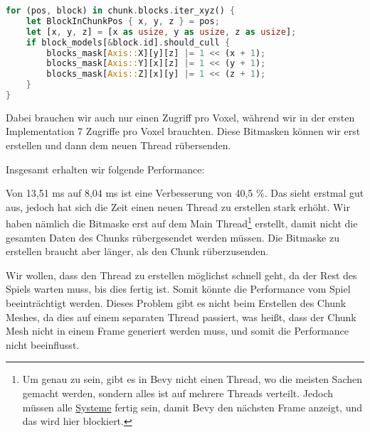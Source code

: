 \begin{lstlisting}[language=Rust]
for (pos, block) in chunk.blocks.iter_xyz() {
	let BlockInChunkPos { x, y, z } = pos;
	let [x, y, z] = [x as usize, y as usize, z as usize];
	if block_models[&block.id].should_cull {
		blocks_mask[Axis::X][y][z] |= 1 << (x + 1);
		blocks_mask[Axis::Y][x][z] |= 1 << (y + 1);
		blocks_mask[Axis::Z][x][y] |= 1 << (z + 1);
	}
}
\end{lstlisting}

Dabei brauchen wir auch nur einen Zugriff pro Voxel,
während wir in der ersten Implementation 7 Zugriffe
pro Voxel brauchten.
Diese Bitmasken können wir erst erstellen und
dann dem neuen Thread rübersenden.


Insgesamt erhalten wir folgende Performance:

\vspace{0.3cm}


\vspace{0.3cm}

Von 13,51 ms auf 8,04 ms ist eine Verbesserung
von 40,5 \%. Das sieht erstmal gut aus,
jedoch hat sich die Zeit einen neuen Thread zu
erstellen stark erhöht. Wir haben nämlich die Bitmaske
erst auf dem Main Thread\footnote{
	Um genau zu sein, gibt es in Bevy
	nicht einen  Thread, wo die meisten Sachen
	gemacht werden, sondern alles ist auf mehrere Threads
	verteilt. Jedoch müssen alle
	\href{https://bevy-cheatbook.github.io/programming/systems.html}{Systeme}
	\cite{bevy_systems} fertig sein, damit Bevy den
	nächsten Frame anzeigt, und das wird hier blockiert.
}
erstellt, damit nicht die
gesamten Daten des Chunks rübergesendet werden müssen.
Die Bitmaske zu erstellen braucht aber länger,
als den Chunk rüberzusenden.

Wir wollen, dass den Thread zu erstellen möglichst
schnell geht, da der Rest des Spiels warten muss,
bis dies fertig ist. Somit könnte die Performance
vom Spiel beeinträchtigt werden. Dieses Problem gibt
es nicht beim Erstellen des Chunk Meshes, da dies auf
einem separaten Thread passiert, was heißt, dass der
Chunk Mesh nicht in einem Frame generiert werden muss,
und somit die Performance nicht beeinflusst.


